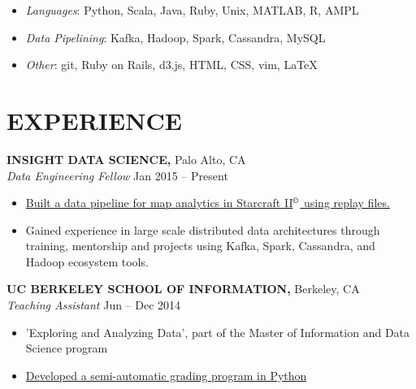 \documentclass[geomargin]{res}
\begin{document}
\begin{resume}
\begin{itemize}
  \item \textit{Languages}: Python, Scala, Java, Ruby, Unix, MATLAB, R, AMPL
  \item \textit{Data Pipelining}: Kafka, Hadoop, Spark, Cassandra, MySQL
  \item \textit{Other}: git, Ruby on Rails, d3.js, HTML, CSS, vim, \LaTeX
\end{itemize}


\section{EXPERIENCE}

{\bf INSIGHT DATA SCIENCE,} Palo Alto, CA \\
{\em Data Engineering Fellow} \hfill
Jan 2015 -- Present \\                                          \vspace{-4mm}
\begin{itemize}                                         \itemsep1pt %
  \item \href{https://github.com/gy8/stargazer}
    {Built a data pipeline for map analytics in Starcraft II\(^\copyright\)
     using replay files.}

  \item Gained experience in large scale distributed data architectures through training,
    mentorship and projects using Kafka, Spark, Cassandra, and Hadoop ecosystem tools.
\end{itemize}
\vspace{-1mm}

{\bf UC BERKELEY SCHOOL OF INFORMATION,} Berkeley, CA \\
{\em Teaching Assistant} \hfill
Jun -- Dec 2014 \\                                          \vspace{-4mm}
\begin{itemize}                                         \itemsep1pt %
  \item 'Exploring and Analyzing Data', part of the Master of Information and Data
    Science program
  \item  \href{https://github.com/gy8/project_auto-grading}
    {Developed a semi-automatic grading program in Python}
\end{itemize}
\vspace{-1mm}


\end{resume}
\end{document}
